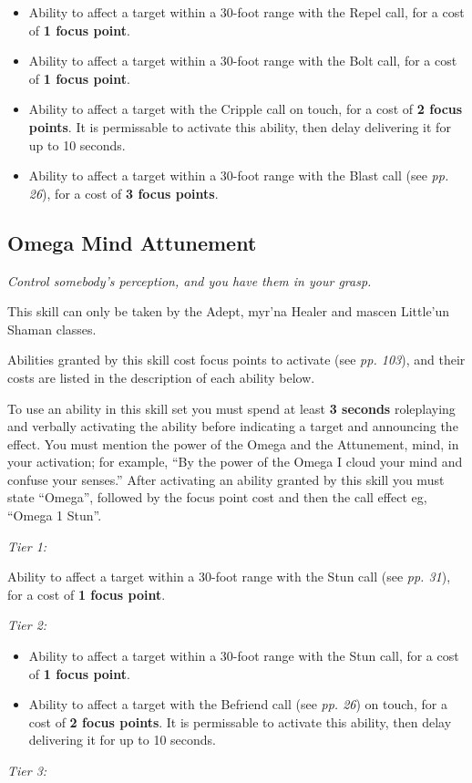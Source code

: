 \begin{itemize}
\item Ability to affect a target within a 30-foot range with the Repel call, for a cost of \textbf{1 focus point}.

\item Ability to affect a target within a 30-foot range with the Bolt call, for a cost of \textbf{1 focus point}.

\item Ability to affect a target with the Cripple call on touch, for a cost of \textbf{2 focus points}. It is permissable to activate this ability, then delay delivering it for up to 10 seconds.

\item Ability to affect a target within a 30-foot range with the Blast call (see \textit{pp. 26}), for a cost of \textbf{3 focus points}.

\end{itemize}
\subsection{Omega Mind Attunement}

\textit{Control somebody's perception, and you have them in your grasp.}

This skill can only be taken by the Adept, myr'na Healer and mascen Little'un Shaman classes.

Abilities granted by this skill cost focus points to activate (see \textit{pp. 103}), and their costs are listed in the description of each ability below.

To use an ability in this skill set you must spend at least \textbf{3 seconds} roleplaying and verbally activating the ability before indicating a target and announcing the effect. You must mention the power of the Omega and the Attunement, mind, in your activation; for example, ``By the power of the Omega I cloud your mind and confuse your senses.'' After activating an ability granted by this skill you must state ``Omega'', followed by the focus point cost and then the call effect eg, ``Omega 1 Stun''.

\textit{Tier 1:}

Ability to affect a target within a 30-foot range with the Stun call (see \textit{pp. 31}), for a cost of \textbf{1 focus point}.

\textit{Tier 2:}

\begin{itemize}
\item Ability to affect a target within a 30-foot range with the Stun call, for a cost of \textbf{1 focus point}.

\item Ability to affect a target with the Befriend call (see \textit{pp. 26}) on touch, for a cost of \textbf{2 focus points}. It is permissable to activate this ability, then delay delivering it for up to 10 seconds.

\end{itemize}
\textit{Tier 3:}

